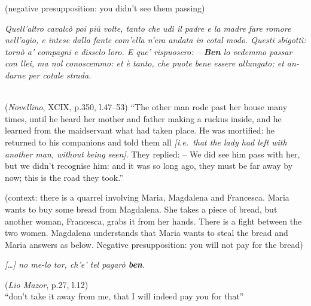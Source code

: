 \documentclass[output=paper]{langsci/langscibook}
\begin{document}
\ea\label{ex:key:12.10}
	(negative presupposition: you didn’t see them passing)\\
    \begin{italian}\emph{Quell’altro cavalcò poi più volte, tanto che udì il
    padre e la madre fare romore nell’agio, e intese dalla fante com'ella
    n’era andata in cotal modo. Questi sbigottì: tornò a’ compagni e disselo
    loro. E que’ rispuosero: – \textbf{Ben} lo vedemmo passar con llei, ma nol
    conoscemmo: et è tanto, che puote bene essere allungato; et andarne per cotale
    strada.}\end{italian}\\
	(\emph{Novellino}, XCIX, p.350, l.47--53)\hfill
    \enquote{The other man rode past her house many times, until he heard her
    mother and father making a ruckus inside, and he learned from the
    maidservant what had taken place. He was mortified: he returned to his
    companions and told them all \emph{[i.e.\ that the lady had left with
    another man, without being seen]}. They replied: -- We did see him pass
    with her, but we didn’t recognise him: and it was so long ago, they
    must be far away by now; this is the road they took.}
\z

\ea\label{ex:key:12.11}
    (context: there is a quarrel involving Maria, Magdalena and Francesca.
    Maria wants to buy some bread from Magdalena. She takes a piece of bread,
    but another woman, Francesca, grabs it from her hands. There is a fight
    between the two women. Magdalena understands that Maria wants to steal the
    bread and Maria answers as below. Negative presupposition: you will not pay
    for the bread)\\
    \begin{italian}\emph{[\dots] no me-lo tor, ch’e’ tel pagarò
    \textbf{ben}.}\end{italian}\hfill
	(\emph{Lio Mazor}, p.27, l.12)\\
    \enquote{don’t take it away from me, that I will indeed pay you for that}
\z
\end{document}
